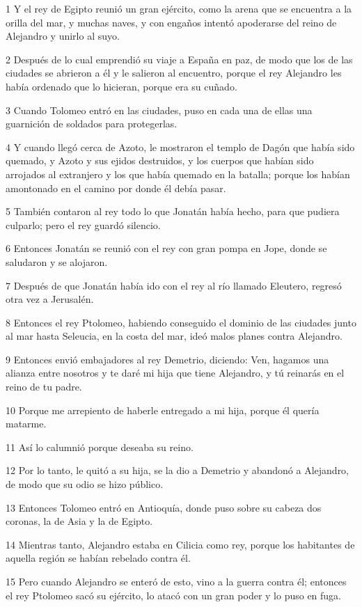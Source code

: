 \par 1 Y el rey de Egipto reunió un gran ejército, como la arena que se encuentra a la orilla del mar, y muchas naves, y con engaños intentó apoderarse del reino de Alejandro y unirlo al suyo.
\par 2 Después de lo cual emprendió su viaje a España en paz, de modo que los de las ciudades se abrieron a él y le salieron al encuentro, porque el rey Alejandro les había ordenado que lo hicieran, porque era su cuñado.
\par 3 Cuando Tolomeo entró en las ciudades, puso en cada una de ellas una guarnición de soldados para protegerlas.
\par 4 Y cuando llegó cerca de Azoto, le mostraron el templo de Dagón que había sido quemado, y Azoto y sus ejidos destruidos, y los cuerpos que habían sido arrojados al extranjero y los que había quemado en la batalla; porque los habían amontonado en el camino por donde él debía pasar.
\par 5 También contaron al rey todo lo que Jonatán había hecho, para que pudiera culparlo; pero el rey guardó silencio.
\par 6 Entonces Jonatán se reunió con el rey con gran pompa en Jope, donde se saludaron y se alojaron.
\par 7 Después de que Jonatán había ido con el rey al río llamado Eleutero, regresó otra vez a Jerusalén.
\par 8 Entonces el rey Ptolomeo, habiendo conseguido el dominio de las ciudades junto al mar hasta Seleucia, en la costa del mar, ideó malos planes contra Alejandro.
\par 9 Entonces envió embajadores al rey Demetrio, diciendo: Ven, hagamos una alianza entre nosotros y te daré mi hija que tiene Alejandro, y tú reinarás en el reino de tu padre.
\par 10 Porque me arrepiento de haberle entregado a mi hija, porque él quería matarme.
\par 11 Así lo calumnió porque deseaba su reino.
\par 12 Por lo tanto, le quitó a su hija, se la dio a Demetrio y abandonó a Alejandro, de modo que su odio se hizo público.
\par 13 Entonces Tolomeo entró en Antioquía, donde puso sobre su cabeza dos coronas, la de Asia y la de Egipto.
\par 14 Mientras tanto, Alejandro estaba en Cilicia como rey, porque los habitantes de aquella región se habían rebelado contra él.
\par 15 Pero cuando Alejandro se enteró de esto, vino a la guerra contra él; entonces el rey Ptolomeo sacó su ejército, lo atacó con un gran poder y lo puso en fuga.
